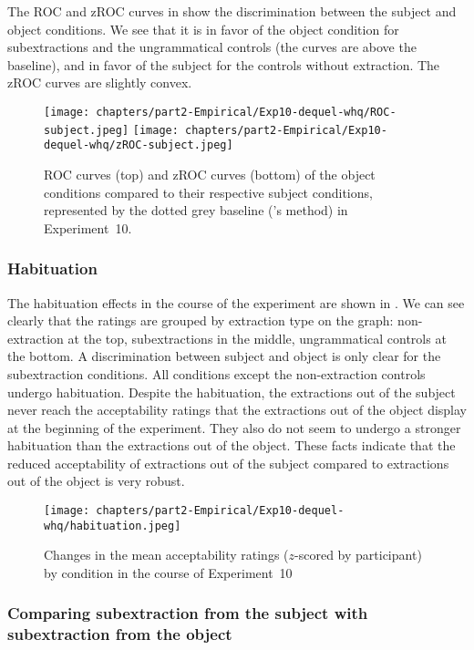 The ROC and zROC curves in  show the discrimination between the subject and object conditions. We see that it is in favor of the object condition for subextractions and the ungrammatical controls (the curves are above the baseline), and in favor of the subject for the controls without extraction. The zROC curves are slightly convex.

\begin{figure}
    \centering
    \texttt{[image: chapters/part2-Empirical/Exp10-dequel-whq/ROC-subject.jpeg]}
    \texttt{[image: chapters/part2-Empirical/Exp10-dequel-whq/zROC-subject.jpeg]}
    \caption{ROC curves (top) and zROC curves (bottom) of the object conditions compared to their respective subject conditions, represented by the dotted grey baseline (\citealt{Dillon.2019}'s method) in Experiment~10.}
    \label{fig:exp10-ROC-subj}
\end{figure}

\subsubsection{Habituation} 

The habituation effects in the course of the experiment are shown in . We can see clearly that the ratings are grouped by extraction type on the graph: non-extraction at the top, subextractions in the middle, ungrammatical controls at the bottom. A discrimination between subject and object is only clear for the subextraction conditions. All conditions except the non-extraction controls undergo habituation. Despite the habituation, the extractions out of the subject never reach the acceptability ratings that the extractions out of the object display at the beginning of the experiment. They also do not seem to undergo a stronger habituation than the extractions out of the object. These facts indicate that the reduced acceptability of extractions out of the subject compared to extractions out of the object is very robust.

\begin{figure}
    \centering
    \texttt{[image: chapters/part2-Empirical/Exp10-dequel-whq/habituation.jpeg]}
    \caption{Changes in the mean acceptability ratings ($z$-scored by participant) by condition in the course of Experiment~10}
    \label{fig:exp10-habituation}
\end{figure}

\subsubsection{Comparing subextraction from the subject with subextraction from the object}

